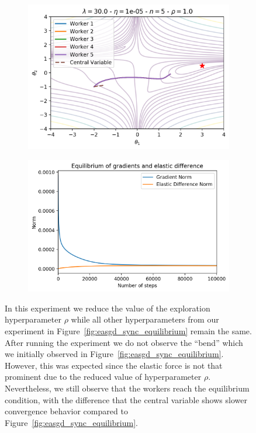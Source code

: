 \begin{figure}[H]
  \centering
  \begin{subfigure}{.45\textwidth}
    \centering
    \includegraphics[width=\linewidth]{resources/images/easgd_sync_norm_space_2.png}
  \end{subfigure}
  \begin{subfigure}{.45\textwidth}
    \centering
    \includegraphics[width=\linewidth]{resources/images/easgd_sync_norm_equilibrium_2.png}
  \end{subfigure}
  \caption{In this experiment we reduce the value of the exploration hyperparameter $\rho$ while all other hyperparameters from our experiment in Figure~\ref{fig:easgd_sync_equilibrium} remain the same. After running the experiment we do not observe the ``bend'' which we initially observed in Figure~\ref{fig:easgd_sync_equilibrium}. However, this was expected since the elastic force is not that prominent due to the reduced value of hyperparameter $\rho$. Nevertheless, we still observe that the workers reach the equilibrium condition, with the difference that the central variable shows slower convergence behavior compared to Figure~\ref{fig:easgd_sync_equilibrium}.}
  \label{fig:easgd_sync_equilibrium_small_rho}
\end{figure}

